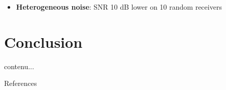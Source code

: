 \documentclass[9pt,xcolor=x11names,compress, notes=show]{beamer}%
\begin{document}
\begin{frame}{\insertsectionhead}
\begin{itemize}
		
		\item 	{\small {\bfseries Heterogeneous noise}: SNR 10 dB lower on 10 random receivers\\}
		\begin{center}		
		\end{center}
	\end{itemize}
\end{frame}

\section{Conclusion}
\begin{frame}{\insertsectionhead}
	contenu...
\end{frame}


\appendix
\begin{frame}{References}
		\scriptsize
		
		
\end{frame}


% 
% 
\end{document}
